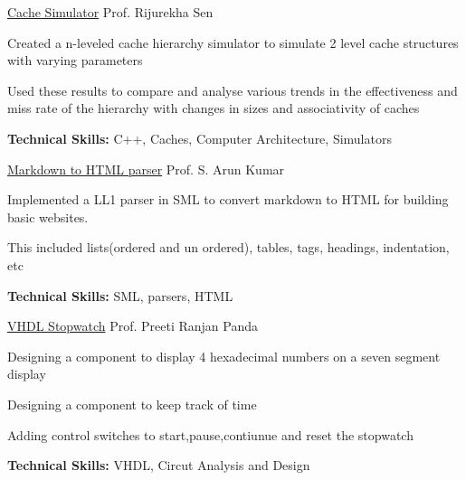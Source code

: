 \begin{cventries}
{\begin{cvitems}
      \end{cvitems}
    }
  \vspace{3mm}
    \cventry
    {} %
    {\href{https://github.com/AnshikSahu/COL216-Assignment3}{Cache Simulator}} %
    {Prof. Rijurekha Sen} %
    {} %
    {
    \vspace{-3mm}
      \begin{cvitems} %
        \item {Created a n-leveled cache hierarchy simulator to simulate 2 level cache structures with varying parameters}
        \item {Used these results to compare and analyse various trends in the effectiveness and miss rate of the hierarchy with changes in sizes and associativity of caches }
        \item {\textbf{Technical Skills:} C++, Caches, Computer Architecture, Simulators}
      \end{cvitems}
    }
    \vspace{3mm}
    \cventry
    {} %
    {\href{https://github.com/AnshikSahu/COL226-Assignment1-2}{Markdown to HTML parser}} %
    {Prof. S. Arun Kumar} %
    {} %
    {
    \vspace{-3mm}
      \begin{cvitems} %
        \item {Implemented a LL1 parser in SML to convert markdown to HTML for building basic websites.}
        \item{This included lists(ordered and un ordered), tables, tags, headings, indentation, etc}
        \item {\textbf{Technical Skills:} SML, parsers, HTML}
      \end{cvitems}
    }
  \cventry
    {} %
    {\href{https://github.com/AnshikSahu/COL215}{VHDL Stopwatch}} %
    {Prof. Preeti Ranjan Panda} %
    {} %
    {
    \vspace{-3mm}
      \begin{cvitems} %
        \item {Designing a component to display 4 hexadecimal numbers on a seven segment display}
        \item{Designing a component to keep track of time}
        \item{Adding control switches to start,pause,contiunue and reset the stopwatch}
        \item {\textbf{Technical Skills:} VHDL, Circut Analysis and Design}

\end{cvitems}}
\end{cventries}
